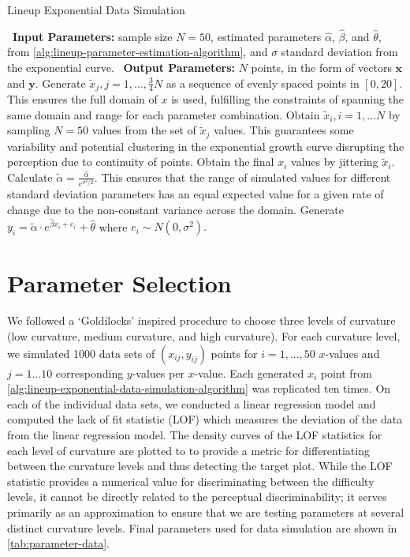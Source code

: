 \documentclass[print]{nuthesis}
\begin{document}
\begin{algorithm}
  \caption{Lineup Exponential Data Simulation}\label{alg:lineup-exponential-data-simulation-algorithm}
  \begin{algorithmic}[1]
    \Statex \textbullet~\textbf{Input Parameters:} sample size $N = 50$, estimated parameters $\hat\alpha$, $\hat\beta$, and $\hat\theta$, from \cref{alg:lineup-parameter-estimation-algorithm}, and $\sigma$ standard deviation from the exponential curve.
    \Statex \textbullet~\textbf{Output Parameters:} $N$ points, in the form of vectors $\mathbf{x}$ and $\mathbf{y}$.
    \State Generate $\tilde x_j, j = 1,..., \frac{3}{4}N$ as a sequence of evenly spaced points in $[0,20]$. This ensures the full domain of $x$ is used, fulfilling the constraints of spanning the same domain and range for each parameter combination.
    \State Obtain $\tilde x_i, i = 1,...N$ by sampling $N = 50$ values from the set of $\tilde x_j$ values. This guarantees some variability and potential clustering in the exponential growth curve disrupting the perception due to continuity of points.
    \State Obtain the final $x_i$ values by jittering $\tilde x_i$.
    \State Calculate $\tilde\alpha = \frac{\hat\alpha}{e^{\sigma^2/2}}.$ This ensures that the range of simulated values for different standard deviation parameters has an equal expected value for a given rate of change due to the non-constant variance across the domain.
    \State Generate $y_i = \tilde\alpha\cdot e^{\hat\beta x_i + e_i}+\hat\theta$ where $e_i\sim N(0,\sigma^2).$
  \end{algorithmic}
\end{algorithm}

\hypertarget{lineups-parameter-selection}{%
\section{Parameter Selection}\label{lineups-parameter-selection}}

We followed a `Goldilocks' inspired procedure to choose three levels of curvature (low curvature, medium curvature, and high curvature). For each curvature level, we simulated 1000 data sets of \((x_{ij}, y_{ij})\) points for \(i = 1,...,50\) \(x\)-values and \(j = 1...10\) corresponding \(y\)-values per \(x\)-value.
Each generated \(x_i\) point from \cref{alg:lineup-exponential-data-simulation-algorithm} was replicated ten times.
On each of the individual data sets, we conducted a linear regression model and computed the lack of fit statistic (LOF) which measures the deviation of the data from the linear regression model.
The density curves of the LOF statistics for each level of curvature are plotted  to to provide a metric for differentiating between the curvature levels and thus detecting the target plot.
While the LOF statistic provides a numerical value for discriminating between the difficulty levels, it cannot be directly related to the perceptual discriminability; it serves primarily as an approximation to ensure that we are testing parameters at several distinct curvature levels.
Final parameters used for data simulation are shown in \cref{tab:parameter-data}.
\end{document}
